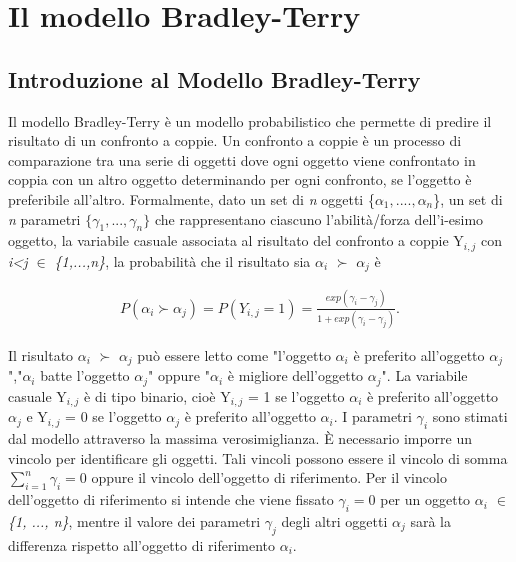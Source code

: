 \chapter{Il modello Bradley-Terry}
\label{cap:BT}


\section{Introduzione al Modello Bradley-Terry}
Il modello Bradley-Terry \autocite{bradley1952rank} è un modello probabilistico che permette di predire il risultato di un confronto a coppie. Un confronto a coppie è un processo di comparazione tra una serie di oggetti dove ogni oggetto viene confrontato in coppia con un altro oggetto determinando per ogni confronto, se l'oggetto è preferibile all'altro.
Formalmente, dato un set di \emph{n} oggetti \{$\alpha_{1},....,\alpha_{n}$\}, un set di \emph{n} parametri $ \{\gamma_{1}, ..., \gamma_{n}\}$ che rappresentano ciascuno l'abilità/forza dell'i-esimo oggetto, la variabile casuale associata al risultato del confronto a coppie Y$_{i,j}$ con \emph{i<j $\in$ \{1,...,n\}}, la probabilità che il risultato sia $\alpha_{i}$ $\succ$ $\alpha_{j}$ è

\begin{align} 
	P(\alpha_{i} \succ \alpha_{j}) = P(Y_{i,j} = 1) = \frac{exp(\gamma_{i} - \gamma_{j})}{1 + exp(\gamma_{i} - \gamma_{j})} \label{for:3.1}.
\end{align}

Il risultato $\alpha_{i}$ $\succ$ $\alpha_{j}$ può essere letto come "l'oggetto $\alpha_{i}$ è preferito all'oggetto $\alpha_{j}$","$\alpha_{i}$ batte l'oggetto $\alpha_{j}$" oppure "$\alpha_{i}$ è migliore dell'oggetto $\alpha_{j}$". La variabile casuale Y$_{i,j}$ è di tipo binario, cioè Y$_{i,j}$ = 1 se l'oggetto $\alpha_{i}$ è preferito all'oggetto $\alpha_{j}$ e Y$_{i,j}$ = 0 se l'oggetto $\alpha_{j}$ è preferito all'oggetto $\alpha_{i}$. I parametri $\gamma_{i}$ sono stimati dal modello attraverso la massima verosimiglianza.
È necessario imporre un vincolo per identificare gli oggetti. Tali vincoli possono essere il vincolo di somma $ \sum_{i=1}^{n} \gamma_{i} = 0 $ oppure il vincolo dell'oggetto di riferimento.
Per il vincolo dell'oggetto di riferimento si intende che viene fissato $\gamma_{i} = 0$ per un oggetto \emph{$\alpha_{i}$ $\in$ \{1, ..., n\}}, mentre il valore dei parametri $\gamma_{j}$ degli altri oggetti $\alpha_{j}$ sarà la differenza rispetto all'oggetto di riferimento $\alpha_{i}$.\\

